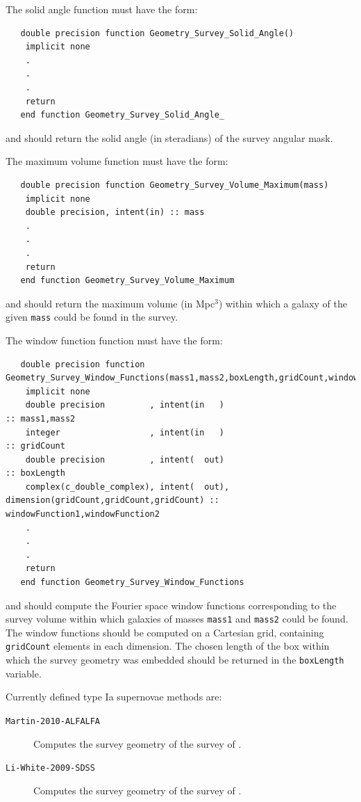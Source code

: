 The solid angle function must have the form:
\begin{verbatim}
   double precision function Geometry_Survey_Solid_Angle()
    implicit none
    .
    .
    .
    return
   end function Geometry_Survey_Solid_Angle_
\end{verbatim}
and should return the solid angle (in steradians) of the survey angular mask.

The maximum volume function must have the form:
\begin{verbatim}
   double precision function Geometry_Survey_Volume_Maximum(mass)
    implicit none
    double precision, intent(in) :: mass
    .
    .
    .
    return
   end function Geometry_Survey_Volume_Maximum 
\end{verbatim}
and should return the maximum volume (in Mpc$^3$) within which a galaxy of the given {\tt mass} could be found in the survey.

The window function function must have the form:
\begin{verbatim}
   double precision function Geometry_Survey_Window_Functions(mass1,mass2,boxLength,gridCount,windowFunction1,windowFunction2)
    implicit none
    double precision         , intent(in   )                                           :: mass1,mass2
    integer                  , intent(in   )                                           :: gridCount
    double precision         , intent(  out)                                           :: boxLength
    complex(c_double_complex), intent(  out), dimension(gridCount,gridCount,gridCount) :: windowFunction1,windowFunction2
    .
    .
    .
    return
   end function Geometry_Survey_Window_Functions 
\end{verbatim}
and should compute the Fourier space window functions corresponding to the survey volume within which galaxies of masses {\tt mass1} and {\tt mass2} could be found. The window functions should be computed on a Cartesian grid, containing {\tt gridCount} elements in each dimension. The chosen length of the box within which the survey geometry was embedded should be returned in the {\tt boxLength} variable.

Currently defined type Ia supernovae methods are:
\begin{description}
 \item [{\tt Martin-2010-ALFALFA}] Computes the survey geometry of the survey of \cite{martin_arecibo_2010}.
 \item [{\tt Li-White-2009-SDSS}] Computes the survey geometry of the survey of \cite{li_distribution_2009}.
\end{description}

